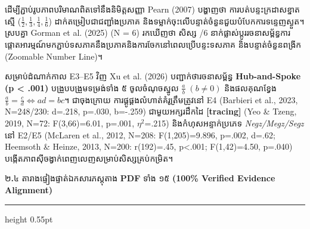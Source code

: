 \documentclass[a4paper,12pt]{article}
\newcommand{\en}[1]{{\TimesEn #1}}
\newcommand{\enbf}[1]{{\TimesEn\textbf{#1}}}
\newcommand{\enit}[1]{{\TimesEn\textit{#1}}}
\newcommand{\subsectitle}[1]{{\muol\fontsize{11.5pt}{15pt}\selectfont #1}}
\newcommand{\subsec}[1]{%
  \Needspace{1.8cm}%
  \vspace{2pt}%
  \subsectitle{#1}\par%
  \vspace{-2pt}%
  {\color{black}\hrule height 0.55pt}%
  \vspace{2pt}%
}
\begin{document}
ដើម្បីភ្ជាប់រូបភាពបរិមាណពិតទៅនឹងនិមិត្តសញ្ញា \en{Pearn (2007)} បង្ហាញថា ការបត់បន្ទះក្រដាសខ្នាតស្មើ ($\frac{1}{2}, \frac{1}{3}, \frac{1}{4}, \frac{1}{6}$) ដាក់តម្រៀបជាជញ្ជាំងប្រភាគ និងទម្លាក់ចុះលើបន្ទាត់ចំនួនជួយបំបែកការទន្ទេញស្ងួត។ ស្របគ្នា \en{Gorman et al. (2025)} (\en{N = 6}) រកឃើញថា សិស្ស \en{5/6} នាក់ផ្លាស់ប្ដូររចនាសម្ព័ន្ធការផ្ដោតអារម្មណ៍មកភ្ជាប់ទសភាគនឹងប្រភាគនិងការចែកនៅពេលប្រើបន្ទះទសភាគ និងបន្ទាត់ចំនួនពង្រីក (\en{Zoomable Number Line})។

សម្រាប់ដំណាក់កាល \en{E3–E5} វិញ \en{Xu et al. (2026)} បញ្ជាក់ថារចនាសម្ព័ន្ធ \en{\textbf{Hub-and-Spoke (p < .001)}} បង្រួបបង្រួមទម្រង់ទាំង ៥ ចូលចំណុចស្នូល $\frac{a}{b}\;(b\neq 0)$ និងផលគុណខ្វែង $\frac{a}{b}=\frac{c}{d}\iff ad=bc$។ ជាចុងក្រោយ ការផ្គូផ្គងលំហាត់គំរូត្រឹមត្រូវនៅ \en{E4} \en{(Barbieri et al., 2023, N=248/230: d=.218, p=.030, b=-.259)} ជាមួយអក្សរដឹកដៃ \en{\textbf{[tracing]}} \en{(Yeo \& Tzeng, 2019, N=72: F(3,66)=6.01, p=.001, $\eta^2$=.215)} និងកំហុសអន្ទាក់ប្រភេទ \enit{Negz/Megz/Segz} នៅ \en{E2/E5} \en{(McLaren et al., 2012, N=208: F(1,205)=9.896, p=.002, d=.62; Heemsoth \& Heinze, 2013, N=200: r(192)=.45, p<.001; F(1,42)=4.50, p=.040)} បង្កើតភាពស៊ីចង្វាក់ពេញលេញសម្រាប់សិស្សគ្រប់កម្រិត។

\subsec{២\enbf{.}៤ តារាងផ្ទៀងផ្ទាត់ឯកសារភស្តុតាង \enbf{PDF} ទាំង ១៥ \enbf{(100\% Verified Evidence Alignment)}}
\end{document}
